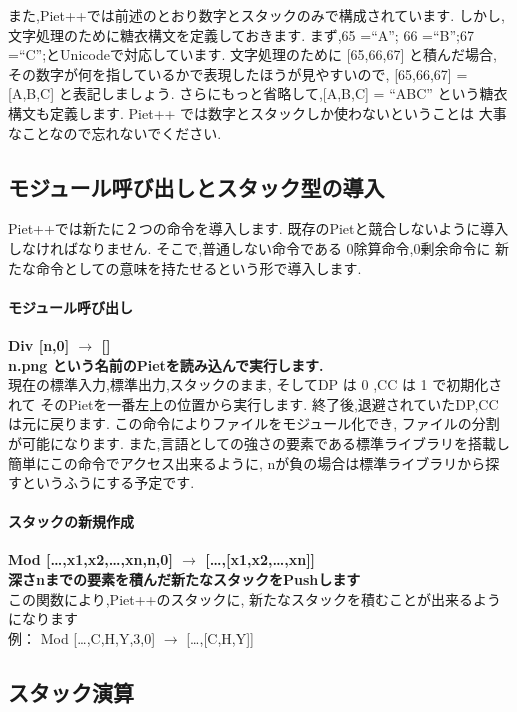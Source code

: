 また,Piet++では前述のとおり数字とスタックのみで構成されています.
しかし,文字処理のために糖衣構文を定義しておきます. まず,65 =``A''; 66
=``B'';67 =``C'';とUnicodeで対応しています. 文字処理のために
{[}65,66,67{]} と積んだ場合,
その数字が何を指しているかで表現したほうが見やすいので, {[}65,66,67{]} =
{[}A,B,C{]} と表記しましょう. さらにもっと省略して,{[}A,B,C{]} = ``ABC''
という糖衣構文も定義します. Piet++
では数字とスタックしか使わないということは
大事なことなので忘れないでください.　　

\subsection{モジュール呼び出しとスタック型の導入}

Piet++では新たに２つの命令を導入します.
既存のPietと競合しないように導入しなければなりません.
そこで,普通しない命令である 0除算命令,0剰余命令に
新たな命令としての意味を持たせるという形で導入します.

\paragraph{モジュール呼び出し}

\textbf{Div {[}n,0{]} $\to$ {[}{]}}\\\textbf{n.png
という名前のPietを読み込んで実行します.}\\現在の標準入力,標準出力,スタックのまま,
そしてDP は 0 ,CC は 1 で初期化されて
そのPietを一番左上の位置から実行します.
終了後,退避されていたDP,CCは元に戻ります.
この命令によりファイルをモジュール化でき,
ファイルの分割が可能になります.
また,言語としての強さの要素である標準ライブラリを搭載し
簡単にこの命令でアクセス出来るように,
nが負の場合は標準ライブラリから探すというふうにする予定です.

\paragraph{スタックの新規作成}

\textbf{Mod {[}\ldots{},x1,x2,\ldots{},xn,n,0{]} $\to$
{[}\ldots{},{[}x1,x2,\ldots{},xn{]}{]}}\\\textbf{深さnまでの要素を積んだ新たなスタックをPushします}\\この関数により,Piet++のスタックに,
新たなスタックを積むことが出来るようになります\\例： Mod
{[}\ldots{},C,H,Y,3,0{]} $\to$ {[}\ldots{},{[}C,H,Y{]}{]}

\subsection{スタック演算}


